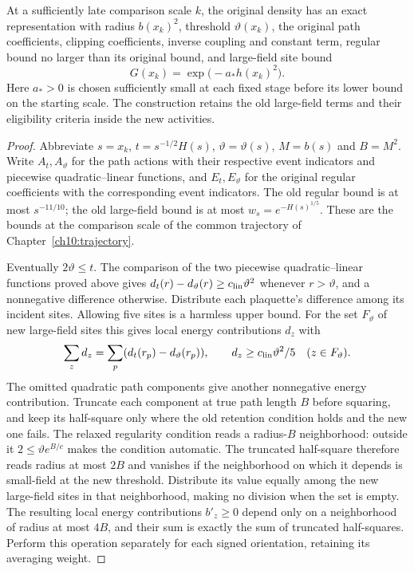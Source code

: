 \begin{proposition}
\label{ch11:restart-endpoint}
At a sufficiently late comparison scale $k$, the original density has an
exact representation with radius $b(x_k)^2$, threshold
$\vartheta(x_k)$, the original path coefficients, clipping coefficients,
inverse coupling and constant term, regular bound no larger than its original
bound, and large-field site bound
\[
 G(x_k)=\exp\bigl(-a_*h(x_k)^2\bigr).
\]
Here $a_*>0$ is chosen sufficiently small at each fixed stage before
its lower bound on the starting scale. The construction retains the old large-field
terms and their eligibility criteria inside the new activities.
\end{proposition}
\begin{proof}
Abbreviate $s=x_k$, $t=s^{-1/2}H(s)$, $\vartheta=\vartheta(s)$,
$M=b(s)$ and $B=M^2$. Write $A_t,A_\vartheta$ for the path actions
with their respective event indicators and piecewise quadratic--linear functions, and $E_t,E_\vartheta$ for
the original regular coefficients with the corresponding event indicators.
The old regular bound is at most $s^{-11/10}$; the old
large-field bound is at most $w_s=e^{-H(s)^{1/5}}$.
These are the bounds at the comparison scale of the common trajectory of Chapter~\ref{ch10:trajectory}.

Eventually $2\vartheta\le t$. The comparison of the two piecewise quadratic--linear functions proved above gives
$d_t(r)-d_\vartheta(r)\ge c_{\rm lin}\vartheta^2$ whenever
$r>\vartheta$, and a nonnegative difference otherwise.
Distribute each plaquette's difference among its incident sites.
Allowing five sites is a harmless upper bound. For the set
$F_\vartheta$ of new large-field sites this gives local energy contributions $d_z$ with
\[
 \sum_zd_z=\sum_p(d_t(r_p)-d_\vartheta(r_p)),\qquad
 d_z\ge c_{\rm lin}\vartheta^2/5\quad(z\in F_\vartheta).
\]
The omitted quadratic path components give another nonnegative energy contribution.
Truncate each component at true path length $B$ before squaring, and keep
its half-square only where the old retention condition holds and the new one
fails. The relaxed regularity condition reads a radius-$B$ neighborhood: outside it
$2\le\vartheta e^{B/c}$ makes the condition automatic. The truncated
half-square therefore reads radius at most $2B$ and vanishes if the
neighborhood on which it depends is small-field at the new threshold. Distribute its value equally
among the new large-field sites in that neighborhood, making no division
when the set is empty. The resulting local energy contributions $b'_z\ge0$ depend only on a neighborhood of radius
at most $4B$, and their sum is exactly the sum of truncated
half-squares. Perform this operation separately for each signed
orientation, retaining its averaging weight.


\end{proof}
